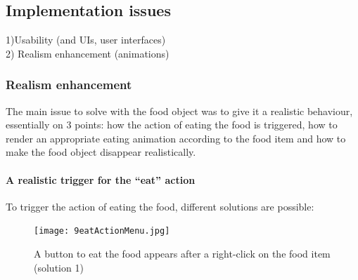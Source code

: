 \begin{itemize}
\begin{itemize}
\subsection{Implementation issues}
1)Usability (and UIs, user interfaces)\\
2) Realism enhancement (animations)


    \subsubsection{Realism enhancement}
The main issue to solve with the food object was to give it a realistic behaviour, essentially on 3 points: how the action of eating the food is triggered, how to render an appropriate eating animation according to the food item and how to make the food object disappear realistically.
\\
	\paragraph{A realistic trigger for the ``eat'' action}
\label{sec:food}

To trigger the action of eating the food, different solutions are possible: \\



\begin{figure}[h]
  \caption{A button to eat the food appears after a right-click on the food item (solution 1)}
  \centering
  \texttt{[image: 9eatActionMenu.jpg]}
  \label{fig:9eatActionMenu}
\end{figure}



\end{itemize}
\end{itemize}
